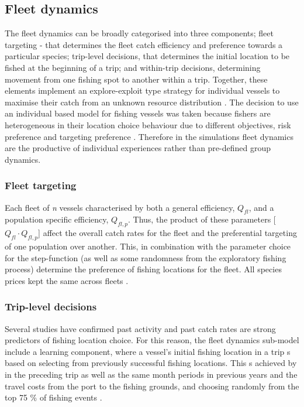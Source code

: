 \documentclass[review]{elsarticle}
\begin{document}
\subsection{Fleet dynamics}

The fleet dynamics can be broadly categorised into three components; fleet
targeting - that determines the fleet catch efficiency
and preference towards a particular species; trip-level decisions, that 
determines the initial location to be fished at the beginning of
a trip; and within-trip decisions, determining movement from one fishing spot
to another within a trip. Together, these elements implement an explore-exploit
type strategy for individual vessels to maximise their catch from an unknown
resource distribution \cite{Bailey2018}. The decision to use an individual
based model for fishing vessels was taken because fishers are heterogeneous in
their location choice behaviour due to different objectives, risk preference
and targeting preference \citep{VanPutten2012a}. Therefore in the simulations
fleet dynamics are the productive of individual experiences rather than
pre-defined group dynamics. 

\subsubsection{Fleet targeting}

Each fleet of \textit{n} vessels  characterised by
both a general efficiency, $Q_{fl}$, and a population specific efficiency,
${Q_{fl, p}}$.  Thus, the product of these parameters [$Q_{fl} \cdot Q_{fl,
	p}$] affect the overall catch rates for the
fleet and the preferential targeting of one population over another. This, in
combination with the parameter choice for the step-function
 (as well as some randomness from the exploratory
fishing process) determine the preference of fishing
locations for the fleet.  All species prices  kept
the same across fleets .  

\subsubsection{Trip-level decisions}

Several studies \citep[e.g.][]{Hutton2004, Tidd2012, Girardin2015} have
confirmed past activity and past catch rates are strong predictors of fishing
location choice. For this reason, the fleet dynamics sub-model
include a learning component, where a vessel's initial
fishing location in a trip s based on selecting from
previously successful fishing locations. This s achieved
by  in the preceding trip as well as the same month
periods in previous years and the travel costs from the port to the fishing
grounds, and choosing randomly from the top 75 \% of fishing events
. 
\end{document}
